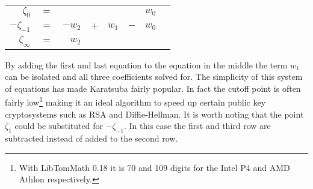 \documentclass[b5paper]{book}
\begin{document}
\begin{center}
\begin{tabular}{rcrcrcrc}
$\zeta_{0}$ &      $=$ &  &  &  & & $w_0$ \\
$-\zeta_{-1}$ &    $=$ & $-w_2$ & $+$ & $w_1$ & $-$ & $w_0$ \\
$\zeta_{\infty}$ & $=$ & $w_2$ &  & &  & \\
\end{tabular}
\end{center}

By adding the first and last equation to the equation in the middle the term $w_1$ can be isolated and all three coefficients solved for.  The simplicity
of this system of equations has made Karatsuba fairly popular.  In fact the cutoff point is often fairly low\footnote{With LibTomMath 0.18 it is 70 and 109 digits for the Intel P4 and AMD Athlon respectively.}
making it an ideal algorithm to speed up certain public key cryptosystems such as RSA and Diffie-Hellman.  It is worth noting that the point 
$\zeta_1$ could be substituted for $-\zeta_{-1}$.  In this case the first and third row are subtracted instead of added to the second row.  
\end{document}
